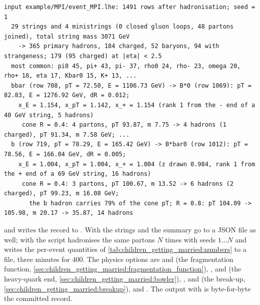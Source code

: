 \begin{verbatim}
input example/MPI/event_MPI.lhe: 1491 rows after hadronisation; seed = 1
  29 strings and 4 ministrings (0 closed gluon loops, 48 partons joined), total string mass 3071 GeV
    -> 365 primary hadrons, 184 charged, 52 baryons, 94 with strangeness; 179 (95 charged) at |eta| < 2.5
  most common: pi0 45, pi+ 43, pi- 37, rho0 24, rho- 23, omega 20, rho+ 18, eta 17, Kbar0 15, K+ 13, ...
  bbar (row 708, pT = 72.50, E = 1106.73 GeV) -> B*0 (row 1069): pT = 82.83, E = 1276.92 GeV, dR = 0.012;
    x_E = 1.154, x_pT = 1.142, x_+ = 1.154 (rank 1 from the - end of a 40 GeV string, 5 hadrons)
     cone R = 0.4: 4 partons, pT 93.87, m 7.75 -> 4 hadrons (1 charged), pT 91.34, m 7.58 GeV; ...
  b (row 719, pT = 78.29, E = 165.42 GeV) -> B*bar0 (row 1012): pT = 78.56, E = 166.04 GeV, dR = 0.005;
    x_E = 1.004, x_pT = 1.004, x_+ = 1.004 (z drawn 0.984, rank 1 from the + end of a 69 GeV string, 16 hadrons)
     cone R = 0.4: 3 partons, pT 100.67, m 13.52 -> 6 hadrons (2 charged), pT 99.23, m 16.08 GeV;
       the b hadron carries 79% of the cone pT; R = 0.8: pT 104.09 -> 105.98, m 20.17 -> 35.87, 14 hadrons
\end{verbatim}
and writes the record to . With
 the strings and the summary go to a JSON file as well; with
 the script hadronises the same partons $N$ times with
seeds $1\ldots N$ and writes the per-event quantities of
\cref{tab:children_getting_married:numbers} to a  file,
three minutes for $400$. The physics options are  and
 (the fragmentation function, \cref{sec:children_getting_married:fragmentation_function}),
,  and  (the heavy-quark
end, \cref{sec:children_getting_married:bowler}), ,
 and  (the break-up,
\cref{sec:children_getting_married:breakup}), and . The
output with  is byte-for-byte the committed record.


